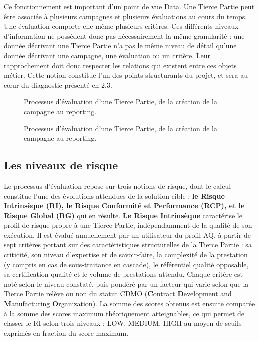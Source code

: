 Ce fonctionnement est important d’un point de vue Data. Une Tierce Partie peut être 
associée à plusieurs campagnes et plusieurs évaluations au cours du temps. Une évaluation 
comporte elle-même plusieurs critères. Ces différents niveaux d’information ne possèdent 
donc pas nécessairement la même granularité : une donnée décrivant une Tierce Partie n’a 
pas le même niveau de détail qu’une donnée décrivant une campagne, une évaluation ou un 
critère. Leur rapprochement doit donc respecter les relations qui existent entre ces objets 
métier. Cette notion constitue l'un des points structurants du projet, et sera au cœur du 
diagnostic présenté en 2.3. 

\begin{figure}[H]
    \centering
    \caption{Processus d'évaluation d'une Tierce Partie, de la création de la campagne au reporting. }
    \label{fig:processus_evaluation_tierce_partie_1}
\end{figure}

\begin{figure}[H]
    \centering
    \caption{Processus d'évaluation d'une Tierce Partie, de la création de la campagne au reporting.}
    \label{fig:processus_evaluation_tierce_partie_2}
\end{figure}

\subsection{Les niveaux de risque}

Le processus d'évaluation repose sur trois notions de risque, dont le calcul constitue l'une 
des évolutions attendues de la solution cible : \textbf{le Risque Intrinsèque (RI), le Risque Conformité et Performance (RCP), et le Risque Global (RG)} qui en résulte.
\textbf{Le Risque Intrinsèque} caractérise le profil de risque propre à une Tierce Partie, 
indépendamment de la qualité de son exécution. Il est évalué annuellement par un utilisateur 
du profil AQ, à partir de sept critères portant sur des caractéristiques structurelles de la Tierce 
Partie : sa criticité, son niveau d'expertise et de savoir-faire, la complexité de la prestation (y 
compris en cas de sous-traitance en cascade), le référentiel qualité opposable, sa certification 
qualité et le volume de prestations attendu. Chaque critère est noté selon le niveau constaté, 
puis pondéré par un facteur qui varie selon que la Tierce Partie relève ou non du statut CDMO 
(\textbf{C}ontract \textbf{D}evelopment and \textbf{M}anufacturing \textbf{O}rganization). La somme des scores obtenus est 
ensuite comparée à la somme des scores maximum théoriquement atteignables, ce qui 
permet de classer le RI selon trois niveaux : LOW, MEDIUM, HIGH au moyen de seuils 
exprimés en fraction du score maximum.\\

